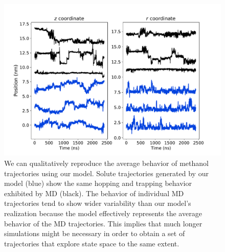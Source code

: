 \documentclass{article}
\begin{document}
  \begin{figure}
  \centering
  \includegraphics[width=\textwidth]{trajectory_realizations_MET.pdf}

  \caption{We can qualitatively reproduce the average behavior of methanol trajectories
  using our model. Solute trajectories generated by our model (blue) show the same
  hopping and trapping behavior exhibited by MD (black). The behavior of individual 
  MD trajectories tend to show wider variability than our model's realization because
  the model effectively represents the average behavior of the MD trajectories. This 
  implies that much longer simulations might be necessary in order to obtain a set
  of trajectories that explore state space to the same extent.
   }\label{fig:trajectory_realizations_MET}
  \end{figure}
  
\end{document}
